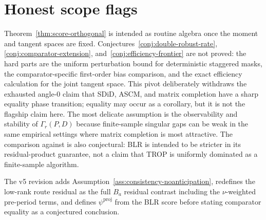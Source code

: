 \documentclass[11pt]{article}
\theoremstyle{definition}
\theoremstyle{plain}
\theoremstyle{remark}
\begin{document}
\section{Honest scope flags}
Theorem~\ref{thm:score-orthogonal} is intended as routine algebra once the
moment and tangent spaces are fixed. Conjectures~\ref{conj:double-robust-rate},
\ref{conj:comparator-extension}, and~\ref{conj:efficiency-frontier} are not
proved: the hard parts are the uniform perturbation bound for deterministic
staggered masks, the comparator-specific first-order bias comparison, and the
exact efficiency calculation for the joint tangent space. This pivot deliberately
withdraws the exhausted angle-0 claim that SDiD, ASCM, and matrix completion
have a sharp equality phase transition; equality may occur as a corollary, but
it is not the flagship claim here. The most delicate assumption is the
observability and stability of $\Gamma_r(P,D)$ because finite-sample singular
gaps can be weak in the same empirical settings where matrix completion is
most attractive. The comparison against \citet{AtheyImbensQuViviano2025} is
also conjectural: BLR is intended to be stricter in its residual-product
guarantee, not a claim that TROP is uniformly dominated as a finite-sample
algorithm.

The v5 revision adds Assumption~\ref{ass:consistency-noanticipation}, redefines
the low-rank route residual as the full $B_a$ residual contrast including the
$\nu$-weighted pre-period terms, and defines $\psi^{\mathrm{proj}}$ from the
BLR score before stating comparator equality as a conjectured conclusion.
\end{document}
